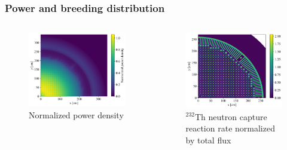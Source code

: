 \begin{frame}
  \frametitle{Power and breeding distribution}
    \begin{columns}
    \column[t]{6cm}
  \begin{figure}[t]
   \vspace{-0.25in}
   \hspace*{-0.15in}
   \includegraphics[height=0.6\textheight]{./images/power_distribution.png}
   \vspace{-0.1in}
   \caption{Normalized power density}
    \end{figure}

    \column[t]{6cm}
  \begin{figure}[t]
   \vspace{-0.25in}
	\hspace*{-0.05in}
   \includegraphics[height=0.6\textheight]{./images/breeding_distribution.png}
   \vspace{-0.1in}
   \caption{$^{232}$Th neutron capture reaction rate normalized by total flux}
    \end{figure}

     \end{columns}
\end{frame}

